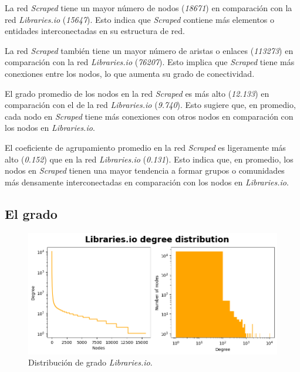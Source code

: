 La red \textit{Scraped} tiene un mayor número de nodos (\textit{18671}) en comparación con la
red \textit{Libraries.io} (\textit{15647}). Esto indica que \textit{Scraped} contiene más elementos o entidades
interconectadas en su estructura de red.

La red \textit{Scraped} también tiene un mayor número de aristas o enlaces (\textit{113273}) en
comparación con la red \textit{Libraries.io} (\textit{76207}). Esto implica que \textit{Scraped} tiene más
conexiones entre los nodos, lo que aumenta su grado de conectividad.

El grado promedio de los nodos en la red \textit{Scraped} es más alto (\textit{12.133}) en
comparación con el de la red \textit{Libraries.io} (\textit{9.740}). Esto sugiere que, en promedio, cada nodo
en \textit{Scraped} tiene más conexiones con otros nodos en comparación con los nodos en \textit{Libraries.io}.

El coeficiente de agrupamiento promedio en la red \textit{Scraped} es
ligeramente más alto (\textit{0.152}) que en la red \textit{Libraries.io} (\textit{0.131}). Esto indica que,
en promedio, los nodos en \textit{Scraped} tienen una mayor tendencia a formar grupos o comunidades más densamente
interconectadas en comparación con los nodos en \textit{Libraries.io}.

\subsection{El grado}

\begin{figure}[ht!]
    \begin{center}
        \includegraphics[width=1\textwidth]{img/cran/distribucion_grado.png}
        \caption{Distribución de grado \textit{Libraries.io}.}
        \label{fig:cran_degree_distribution}
    \end{center}
\end{figure}

